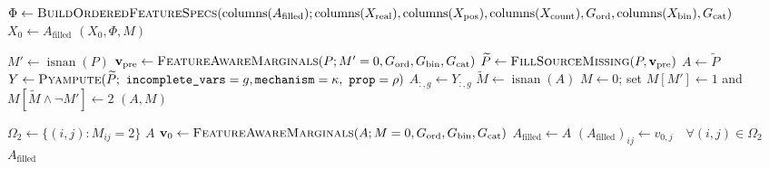 \begin{algorithm}[ht]
\begin{algorithmic}[1]
  \State $\Phi\gets\textsc{BuildOrderedFeatureSpecs}
         (\operatorname{columns}(A_{\mathrm{filled}});
          \operatorname{columns}(X_{\mathrm{real}}),
          \operatorname{columns}(X_{\mathrm{pos}}),
          \operatorname{columns}(X_{\mathrm{count}}),
          G_{\mathrm{ord}},\operatorname{columns}(X_{\mathrm{bin}}),G_{\mathrm{cat}})$
  \State $X_0\gets A_{\mathrm{filled}}$
  \State \Return $(X_0,\Phi,M)$
\EndProcedure

\Statex
{}
  \State $M'\gets\operatorname{isnan}(P)$
  \State $\mathbf v_{\mathrm{pre}}\gets
         \textsc{FeatureAwareMarginals}(P;M'=0,G_{\mathrm{ord}},G_{\mathrm{bin}},G_{\mathrm{cat}})$
  \State $\widetilde P\gets\textsc{FillSourceMissing}(P,\mathbf v_{\mathrm{pre}})$
  \State $A\gets\widetilde P$
    \State $Y\gets\textsc{Pyampute}
           (\widetilde P;\ \texttt{incomplete\_vars}=g,
            \texttt{mechanism}=\kappa,\ \texttt{prop}=\rho)$
    \State $A_{:,g}\gets Y_{:,g}$
  \EndFor
  \State $\widetilde M\gets\operatorname{isnan}(A)$
  \State $M\gets 0$; set $M[M']\gets 1$ and
         $M[\widetilde M\land\neg M']\gets 2$
  \State \Return $(A,M)$
\EndProcedure

\Statex
{}
  \State $\Omega_2\gets\{(i,j):M_{ij}=2\}$
    \State \Return $A$
  \EndIf
  \State $\mathbf v_0\gets
         \textsc{FeatureAwareMarginals}(A;M=0,G_{\mathrm{ord}},G_{\mathrm{bin}},G_{\mathrm{cat}})$
  \State $A_{\mathrm{filled}}\gets A$
  \State $(A_{\mathrm{filled}})_{ij}\gets v_{0,j}
         \quad\forall(i,j)\in\Omega_2$
  \State \Return $A_{\mathrm{filled}}$
\EndProcedure
\end{algorithmic}
\end{algorithm}
